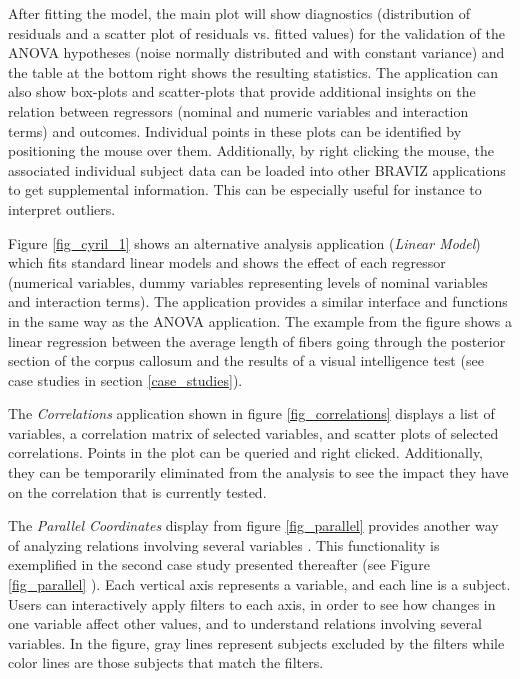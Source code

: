 \documentclass{frontiersHLTH}
\begin{document}
After fitting the model, the main plot will show diagnostics (distribution of residuals and a scatter plot of residuals vs. fitted values) for the validation of the ANOVA hypotheses (noise normally distributed and with constant variance) and the table at the bottom right shows the resulting statistics. The application can also show box-plots and scatter-plots that provide additional insights on the relation between regressors (nominal and numeric variables and interaction terms) and outcomes. Individual points in these plots can be identified by positioning the mouse over them. Additionally, by right clicking the mouse, the associated individual subject data can be loaded into other BRAVIZ applications to get supplemental information. This can be especially useful for instance to interpret outliers.

Figure \ref{fig_cyril_1} shows an alternative analysis application (\emph{Linear Model}) which fits standard linear models and shows the effect of each regressor (numerical variables, dummy variables representing levels of nominal variables and interaction terms). The application provides a similar interface and functions in the same way as the ANOVA application. The example from the figure shows a linear regression between the average length of fibers going through the posterior section of the corpus callosum and the results of a visual intelligence test (see case studies in section \ref{case_studies}).  

The \emph{Correlations} application shown in figure \ref{fig_correlations} displays a list of variables, a correlation matrix of selected variables, and scatter plots of selected correlations. Points in the plot can be queried and right clicked. Additionally, they can be temporarily eliminated from the analysis to see the impact they have on the correlation that is currently tested. 

The \emph{Parallel Coordinates} display from figure \ref{fig_parallel} provides another way of analyzing relations involving several variables . This functionality is exemplified in the second case study presented thereafter (see Figure \ref{fig_parallel} ). Each vertical axis represents a variable, and each line is a subject. Users can interactively apply filters to each axis, in order to see how changes in one variable affect other values, and to understand relations involving several variables. In the figure, gray lines represent subjects excluded by the filters while color lines are those subjects that match the filters.
\end{document}
